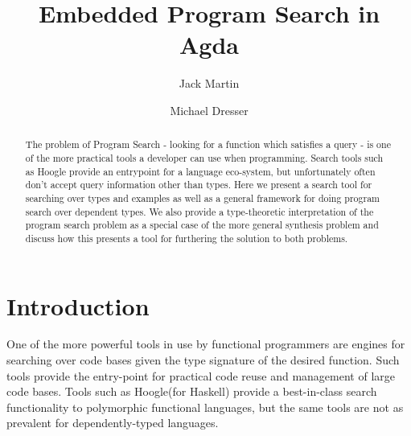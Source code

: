 \documentclass[acmsmall,review,authorversion]{acmart}
\newcommand{\?}{\stackrel{?}{\approx}}
\begin{document}
\title{Embedded Program Search in Agda}


\author{Jack Martin}
\author{Michael Dresser}


\begin{abstract}
The problem of Program Search - looking for a function which satisfies a query -
is one of the more practical tools a developer can use when programming. Search
tools such as Hoogle provide an entrypoint for a language eco-system, but
unfortunately often don't accept query information other than types. Here we
present a search tool for searching over types and examples as well as a general
framework for doing program search over dependent types. We also provide a
type-theoretic interpretation of the program search problem as a special case of
the more general synthesis problem and discuss how this presents a tool for
furthering the solution to both problems.
\end{abstract}

\maketitle

\section{Introduction}

One of the more powerful tools in use by functional programmers are engines for
searching over code bases given the type signature of the desired function. Such
tools provide the entry-point for practical code reuse and management of large
code bases. Tools such as Hoogle(for Haskell) provide a best-in-class search
functionality to polymorphic functional languages, but the same tools are not as
prevalent for dependently-typed languages.
\end{document}
